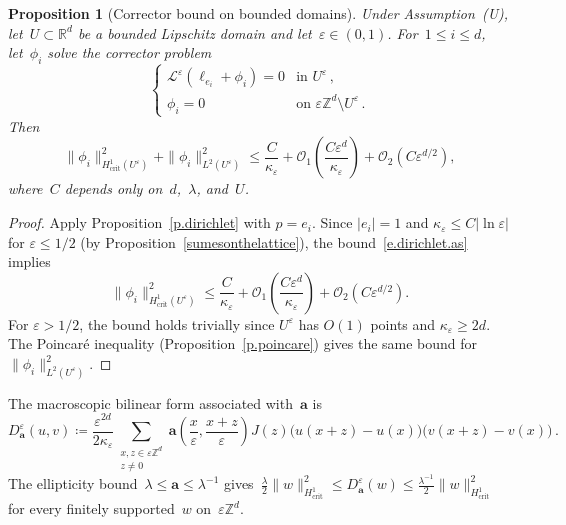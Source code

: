 \documentclass[11pt]{amsart}
\theoremstyle{plain}
\newtheorem{proposition}[theorem]{Proposition}
\theoremstyle{definition}
\theoremstyle{remark}
\newcommand{\Zd}{\mathbb{Z}^d}
\newcommand{\Rd}{\mathbb{R}^d}
\renewcommand{\a}{\mathbf{a}}
\newcommand{\eps}{\varepsilon}
\begin{document}
	\begin{proposition}[Corrector bound on bounded domains]
		\label{p.corrector.domain}
		Under Assumption~\textup{(U)}, let~$U \subset \Rd$ be a bounded Lipschitz domain and let~$\eps \in (0,1)$.
		For~$1 \le i \le d$, let~$\phi_i$ solve the corrector problem
		\begin{equation} \label{e.defcorrector}
			\begin{cases}
				\mathcal{L}^\eps(\ell_{e_i} + \phi_i) = 0 & \text{in } U^\eps\,,\\
				\phi_i = 0 & \text{on } \eps\Zd \setminus U^\eps\,.
			\end{cases}
		\end{equation}
		Then
		\begin{equation}
			\label{e.corrector.bounds}
			\|\phi_i\|_{H^1_{\mathrm{crit}}(U^\eps)}^2 + \|\phi_i\|_{L^2(U^\eps)}^2
			\le \frac{C}{\kappa_\eps}
			+ \mathcal{O}_1\left(\frac{C\eps^d}{\kappa_\eps}\right)
			+ \mathcal{O}_2\left(C\eps^{d/2}\right),
		\end{equation}
		where~$C$ depends only on~$d$,~$\lambda$, and~$U$.
	\end{proposition}
	
	\begin{proof}
		Apply Proposition~\ref{p.dirichlet} with $p = e_i$.
		Since $|e_i| = 1$ and $\kappa_\eps \le C|\ln\eps|$ for $\eps \le 1/2$ (by Proposition~\ref{sumesonthelattice}), the bound~\eqref{e.dirichlet.as} implies
		\[
		\|\phi_i\|_{H^1_{\mathrm{crit}}(U^\eps)}^2
		\le \frac{C}{\kappa_\eps}
		+ \mathcal{O}_1\left(\frac{C\eps^d}{\kappa_\eps}\right)
		+ \mathcal{O}_2\left(C\eps^{d/2}\right).
		\]
		For $\eps > 1/2$, the bound holds trivially since $U^\eps$ has $O(1)$ points and $\kappa_\eps \ge 2d$.
		The Poincar\'e inequality (Proposition~\ref{p.poincare}) gives the same bound for $\|\phi_i\|_{L^2(U^\eps)}^2$.
	\end{proof}
	
	The macroscopic bilinear form associated with~$\a$ is
	\begin{equation}
		\label{e.Daeps}
		D_\a^\eps(u,v) \coloneqq \frac{\eps^{2d}}{2\kappa_\eps}\sum_{\substack{x,z \in \eps\Zd \\ z \ne 0}} \a\left(\frac{x}{\eps},\frac{x{+}z}{\eps}\right) J(z)\bigl(u(x{+}z) - u(x)\bigr)\bigl(v(x{+}z) - v(x)\bigr)\,.
	\end{equation}
	The ellipticity bound~$\lambda \le \a \le \lambda^{-1}$ gives~$\frac{\lambda}{2}\|w\|_{H^1_{\mathrm{crit}}}^2 \le D_\a^\eps(w) \le \frac{\lambda^{-1}}{2}\|w\|_{H^1_{\mathrm{crit}}}^2$ for every finitely supported~$w$ on~$\eps\Zd$.
	
\end{document}
